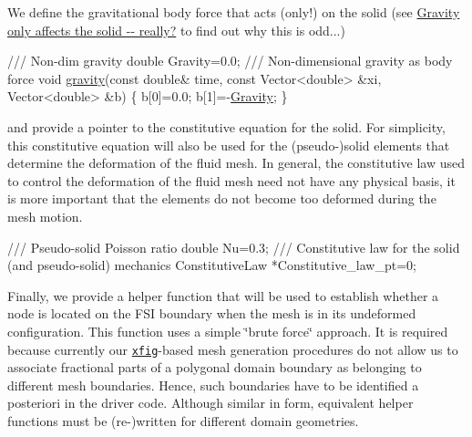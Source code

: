 We define the gravitational body force that acts (only!) on the solid (see \hyperlink{index_b_f}{Gravity only affects the solid -\/-\/ really?} to find out why this is odd...)


\begin{DoxyCodeInclude}
\textcolor{comment}{}
\textcolor{comment}{ /// Non-dim gravity}
\textcolor{comment}{} \textcolor{keywordtype}{double} Gravity=0.0;
\textcolor{comment}{}
\textcolor{comment}{ /// Non-dimensional gravity as body force}
\textcolor{comment}{} \textcolor{keywordtype}{void} \hyperlink{namespaceGlobal__Parameters_a200109847bf4cc26da4d00e8d68d569e}{gravity}(\textcolor{keyword}{const} \textcolor{keywordtype}{double}& time, 
              \textcolor{keyword}{const} Vector<double> &xi, 
              Vector<double> &b)
 \{
  b[0]=0.0;
  b[1]=-\hyperlink{namespaceGlobal__Parameters_a335000b5db4206486a116ae0468d2d0c}{Gravity};
 \}

\end{DoxyCodeInclude}


and provide a pointer to the constitutive equation for the solid. For simplicity, this constitutive equation will also be used for the (pseudo-\/)solid elements that determine the deformation of the fluid mesh. In general, the constitutive law used to control the deformation of the fluid mesh need not have any physical basis, it is more important that the elements do not become too deformed during the mesh motion.


\begin{DoxyCodeInclude}
\textcolor{comment}{}
\textcolor{comment}{ /// Pseudo-solid Poisson ratio}
\textcolor{comment}{} \textcolor{keywordtype}{double} Nu=0.3;
\textcolor{comment}{}
\textcolor{comment}{ /// Constitutive law for the solid (and pseudo-solid) mechanics}
\textcolor{comment}{} ConstitutiveLaw *Constitutive\_law\_pt=0;

\end{DoxyCodeInclude}


Finally, we provide a helper function that will be used to establish whether a node is located on the F\+SI boundary when the mesh is in its undeformed configuration. This function uses a simple \char`\"{}brute force\char`\"{} approach. It is required because currently our \href{http://en.wikipedia.org/wiki/Xfig}{\tt xfig}-\/based mesh generation procedures do not allow us to associate fractional parts of a polygonal domain boundary as belonging to different mesh boundaries. Hence, such boundaries have to be identified a posteriori in the driver code. Although similar in form, equivalent helper functions must be (re-\/)written for different domain geometries.


